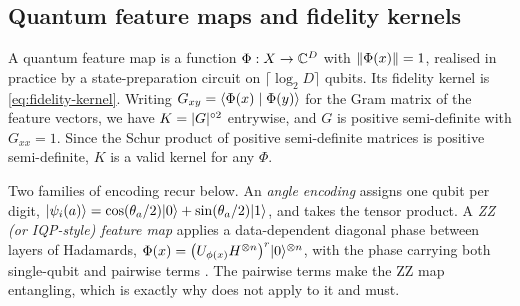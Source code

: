 \subsection{Quantum feature maps and fidelity kernels}

A quantum feature map is a function $\Phi : X \to \mathbb{C}^{D}$ with $\lVert\Phi(x)\rVert = 1$,
realised in practice by a state-preparation circuit on $\lceil \log_2 D \rceil$ qubits.
Its fidelity kernel is \cref{eq:fidelity-kernel}. Writing
$G_{xy} = \langle \Phi(x) \mid \Phi(y) \rangle$ for the Gram matrix of the feature vectors, we
have $K = \lvert G\rvert^{\circ 2}$ entrywise, and $G$ is positive semi-definite with
$G_{xx} = 1$. Since the Schur product of positive semi-definite matrices is positive
semi-definite, $K$ is a valid kernel for any $\Phi$.

Two families of encoding recur below. An \emph{angle encoding} assigns one qubit per
digit, $\lvert \psi_i(a) \rangle = \cos(\theta_a/2)\lvert 0 \rangle + \sin(\theta_a/2)\lvert 1 \rangle$, and takes
the tensor product. A \emph{ZZ (or IQP-style) feature map} applies a data-dependent
diagonal phase between layers of Hadamards,
$\Phi(x) = \bigl(U_{\phi(x)} H^{\otimes n}\bigr)^{r}\lvert 0 \rangle^{\otimes n}$, with the
phase carrying both single-qubit and pairwise terms
\citep{HavlicekEtAl2019QuantumEnhanced}. The pairwise terms make the ZZ map entangling,
which is exactly why  does not apply to it and
 must.
